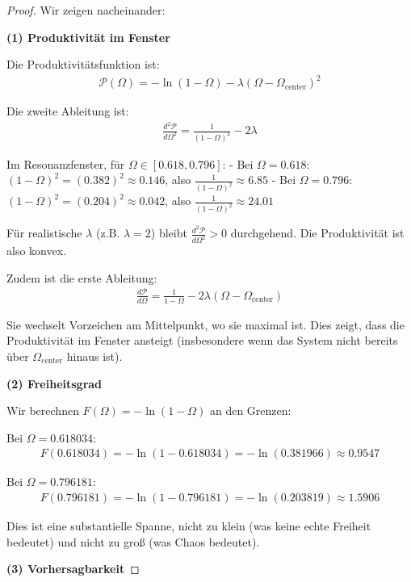 \documentclass[a4paper,12pt,twoside]{report}
\theoremstyle{definition}
\begin{document}
\begin{proof}

Wir zeigen nacheinander:

\textbf{(1) Produktivität im Fenster}

Die Produktivitätsfunktion ist:
\begin{align}
\mathcal{P}(\Omega) = -\ln(1-\Omega) - \lambda(\Omega - \Omega_{\text{center}})^2
\end{align}

Die zweite Ableitung ist:
\begin{align}
\frac{d^2\mathcal{P}}{d\Omega^2} = \frac{1}{(1-\Omega)^2} - 2\lambda
\end{align}

Im Resonanzfenster, für $\Omega \in [0.618, 0.796]$:
- Bei $\Omega = 0.618$: $(1-\Omega)^2 = (0.382)^2 \approx 0.146$, also $\frac{1}{(1-\Omega)^2} \approx 6.85$
- Bei $\Omega = 0.796$: $(1-\Omega)^2 = (0.204)^2 \approx 0.042$, also $\frac{1}{(1-\Omega)^2} \approx 24.01$

Für realistische $\lambda$ (z.B. $\lambda = 2$) bleibt $\frac{d^2\mathcal{P}}{d\Omega^2} > 0$ durchgehend. Die Produktivität ist also konvex.

Zudem ist die erste Ableitung:
\begin{align}
\frac{d\mathcal{P}}{d\Omega} = \frac{1}{1-\Omega} - 2\lambda(\Omega - \Omega_{\text{center}})
\end{align}

Sie wechselt Vorzeichen am Mittelpunkt, wo sie maximal ist. Dies zeigt, dass die Produktivität im Fenster ansteigt (insbesondere wenn das System nicht bereits über $\Omega_{\text{center}}$ hinaus ist).

\textbf{(2) Freiheitsgrad}

Wir berechnen $F(\Omega) = -\ln(1-\Omega)$ an den Grenzen:

Bei $\Omega = 0.618034$:
\begin{align}
F(0.618034) = -\ln(1 - 0.618034) = -\ln(0.381966) \approx 0.9547
\end{align}

Bei $\Omega = 0.796181$:
\begin{align}
F(0.796181) = -\ln(1 - 0.796181) = -\ln(0.203819) \approx 1.5906
\end{align}

Dies ist eine substantielle Spanne, nicht zu klein (was keine echte Freiheit bedeutet) und nicht zu groß (was Chaos bedeutet).

\textbf{(3) Vorhersagbarkeit}


\end{proof}
\end{document}
